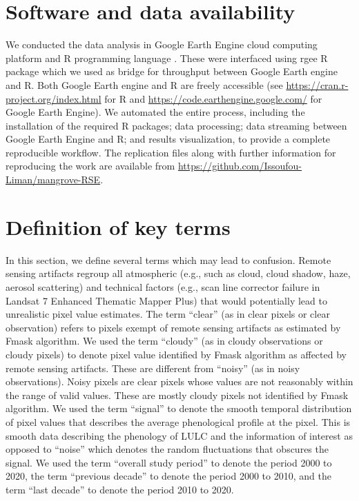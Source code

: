 \documentclass[12pt,oneside,preprint,3p,authoryear,times]{elsarticle} %
\begin{document}
\hypertarget{software-and-data-availability}{%
\section*{Software and data
availability}\label{software-and-data-availability}}

We conducted the data analysis in Google Earth Engine cloud computing
platform \citep{Gorelick-et-al-2017} and R programming language
\citep{R-Core-Team-2021}. These were interfaced using rgee R package
\citep{Aybar-et-al-2020} which we used as bridge for throughput between
Google Earth engine and R. Both Google Earth engine and R are freely
accessible (see \url{https://cran.r-project.org/index.html} for R and
\url{https://code.earthengine.google.com/} for Google Earth Engine). We
automated the entire process, including the installation of the required
R packages; data processing; data streaming between Google Earth Engine
and R; and results visualization, to provide a complete reproducible
workflow. The replication files along with further information for
reproducing the work are available from
\url{https://github.com/Issoufou-Liman/mangrove-RSE}.

\hypertarget{definition-of-key-terms}{%
\section*{Definition of key terms}\label{definition-of-key-terms}}

In this section, we define several terms which may lead to confusion.
Remote sensing artifacts regroup all atmospheric (e.g., such as cloud,
cloud shadow, haze, aerosol scattering) and technical factors (e.g.,
scan line corrector failure in Landsat 7 Enhanced Thematic Mapper Plus)
that would potentially lead to unrealistic pixel value estimates. The
term ``clear'' (as in clear pixels or clear observation) refers to
pixels exempt of remote sensing artifacts as estimated by Fmask
algorithm. We used the term ``cloudy'' (as in cloudy observations or
cloudy pixels) to denote pixel value identified by Fmask algorithm as
affected by remote sensing artifacts. These are different from ``noisy''
(as in noisy observations). Noisy pixels are clear pixels whose values
are not reasonably within the range of valid values. These are mostly
cloudy pixels not identified by Fmask algorithm. We used the term
``signal'' to denote the smooth temporal distribution of pixel values
that describes the average phenological profile at the pixel. This is
smooth data describing the phenology of LULC and the information of
interest as opposed to ``noise'' which denotes the random fluctuations
that obscures the signal. We used the term ``overall study period'' to
denote the period 2000 to 2020, the term ``previous decade'' to denote
the period 2000 to 2010, and the term ``last decade'' to denote the
period 2010 to 2020.
\end{document}
